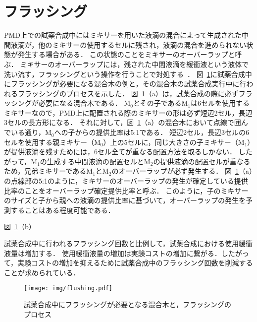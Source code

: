 \section{フラッシング}
    PMD上での試薬合成中にはミキサーを用いた液滴の混合によって生成された中間液滴が，他のミキサーの使用するセルに残され，液滴の混合を進められない状態が発生する場合がある．
    この状態のことをミキサーのオーバーラップと呼ぶ．
    ミキサーのオーバーラップには，残された中間液滴を緩衝液という液体で洗い流す，フラッシングという操作を行うことで対処する~\cite{8715125}．
    図~\ref{fig:flushing}に試薬合成中にフラッシングが必要になる混合木の例と，その混合木の試薬合成実行中に行われるフラッシングのプロセスを示した．
    図~\ref{fig:flushing}（a）は，試薬合成の際に必ずフラッシングが必要になる混合木である．
    M$_0$とその子であるM$_1$は6セルを使用するミキサーなので，PMD上に配置される際のミキサーの形は必ず短辺2セル，長辺3セルの長方形になる．
    それに対して，図~\ref{fig:flushing}（a）の混合木において点線で囲んでいる通り，M$_0$への子からの提供比率は5:1である．
    短辺2セル，長辺3セルの6セルを使用する親ミキサー（M$_0$）上の5セルに，同じ大きさの子ミキサー（M$_1$）が提供液滴を残すためには，6セル全てが重なる配置方法を取るしかない．
    したがって，M$_1$の生成する中間液滴の配置セルとM$_2$の提供液滴の配置セルが重なるため，兄弟ミキサーであるM$_1$とM$_2$のオーバーラップが必ず発生する．
    図~\ref{fig:flushing}（a）の点線部の5:1のように，ミキサーのオーバーラップの発生が確定している提供比率のことをオーバーラップ確定提供比率と呼ぶ．
    このように，子のミキサーのサイズと子から親への液滴の提供比率に基づいて，オーバーラップの発生を予測することはある程度可能である．
    
    図~\ref{fig:flushing}（b）



    試薬合成中に行われるフラッシング回数と比例して，試薬合成における使用緩衝液量は増加する．
    使用緩衝液量の増加は実験コストの増加に繋がる．したがって，実験コストの増加を抑えるために試薬合成中のフラッシング回数を削減することが求められている．


 \begin{figure}[tbp]
    \centering\texttt{[image: img/flushing.pdf]}
    \caption{試薬合成中にフラッシングが必要となる混合木と，フラッシングのプロセス}\label{fig:flushing}
\end{figure}

